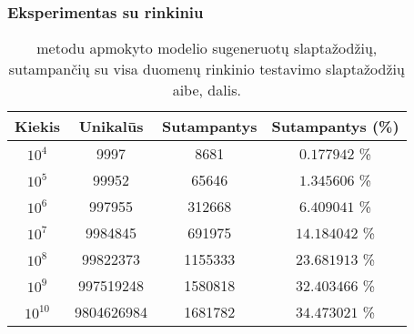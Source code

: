 \documentclass{VUMIFInfBakalaurinis}
\begin{document}
\subsubsection{Eksperimentas su  rinkiniu} %
\begin{table}[ht]
  \centering
  \caption{%
     metodu apmokyto modelio sugeneruotų slaptažodžių, 
    sutampančių su visa  duomenų rinkinio testavimo
    slaptažodžių aibe, dalis.
  }
  \begin{tabular}{|c|c|c|c|}
    \hline \textbf{Kiekis} & \textbf{Unikalūs} & \textbf{Sutampantys} & 
    \textbf{Sutampantys (\%)} \\
    \hline $10^4$ & 9997 & 8681 & $0.177942$ \% \\
    \hline $10^5$ & 99952 & 65646 & $1.345606$ \% \\
    \hline $10^6$ & 997955 & 312668 & $6.409041$ \% \\
    \hline $10^7$ & 9984845 & 691975 & $14.184042$ \% \\
    \hline $10^8$ & 99822373 & 1155333 & $23.681913$ \% \\
    \hline $10^9$ & 997519248 & 1580818 & $32.403466$ \% \\ 
    \hline $10^{10}$ & 9804626984 & 1681782 & $34.473021$ \% \\
    \hline
  \end{tabular}
  \label{tab:pcfg-linkedin-results}
\end{table}
\end{document}
